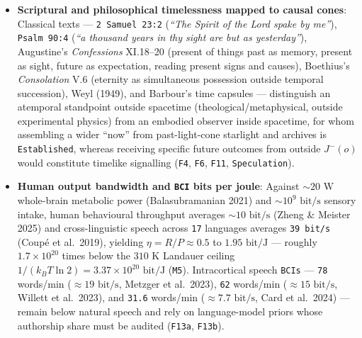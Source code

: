 \documentclass[10pt,letterpaper]{article}
\begin{document}
\begin{itemize}
  experience déjà vu (Brown 2004), yet virtual-navigation experiments
  confirm next-turn prediction stays at chance despite elevated feelings
  of knowing (Cleary \& Claxton 2018; \texttt{F12}), and Bem's (2011)
  \(d = 0.22\) retroactive facilitation failed large replications
  (Ritchie et al.~2012, \(p = 0.83\); Galak et al.~2012,
  \(N = 3{,}289\), \(d = 0.04\); \texttt{F11}).
\item
  \textbf{Scriptural and philosophical timelessness mapped to causal
  cones}: Classical texts --- \texttt{2\ Samuel\ 23:2} (\emph{``The
  Spirit of the Lord spake by me''}), \texttt{Psalm\ 90:4} (\emph{``a
  thousand years in thy sight are but as yesterday''}), Augustine's
  \emph{Confessions} XI.18--20 (present of things past as memory,
  present as sight, future as expectation, reading present signs and
  causes), Boethius's \emph{Consolation} V.6 (eternity as simultaneous
  possession outside temporal succession), Weyl (1949), and Barbour's
  time capsules --- distinguish an atemporal standpoint outside
  spacetime (theological/metaphysical, outside experimental physics)
  from an embodied observer inside spacetime, for whom assembling a
  wider ``now'' from past-light-cone starlight and archives is
  \texttt{Established}, whereas receiving specific future outcomes from
  outside \(J^-(o)\) would constitute timelike signalling (\texttt{F4},
  \texttt{F6}, \texttt{F11}, \texttt{Speculation}).
\item
  \textbf{Human output bandwidth and \texttt{BCI} bits per joule}:
  Against \(\sim 20\text{ W}\) whole-brain metabolic power
  (Balasubramanian 2021) and \(\sim 10^9\text{ bit/s}\) sensory intake,
  human behavioural throughput averages \(\sim 10\text{ bit/s}\) (Zheng
  \& Meister 2025) and cross-linguistic speech across \texttt{17}
  languages averages \texttt{39\ bit/s} (Coupé et al.~2019), yielding
  \(\eta = R/P \approx 0.5\) to \(1.95\text{ bit/J}\) --- roughly
  \(1.7 \times 10^{20}\) times below the \(310\text{ K}\) Landauer
  ceiling \(1/(k_B T \ln 2) = 3.37 \times 10^{20}\text{ bit/J}\)
  (\texttt{M5}). Intracortical speech \texttt{BCIs} --- \texttt{78}
  words/min (\(\approx 19\text{ bit/s}\), Metzger et al.~2023),
  \texttt{62} words/min (\(\approx 15\text{ bit/s}\), Willett et
  al.~2023), and \texttt{31.6} words/min (\(\approx 7.7\text{ bit/s}\),
  Card et al.~2024) --- remain below natural speech and rely on
  language-model priors whose authorship share must be audited
  (\texttt{F13a}, \texttt{F13b}).
\end{itemize}
\end{document}

